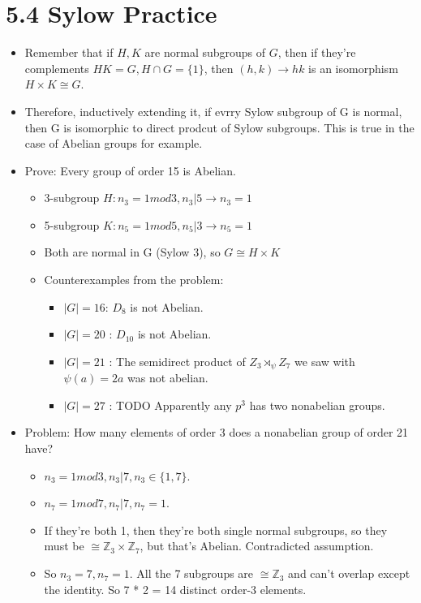 \documentclass[11pt, oneside]{article}   	%
\begin{document}
\section{5.4 Sylow Practice}
\begin{itemize}
\item Remember that if $H, K$ are normal subgroups of $G$, then if they're complements $HK = G, H \cap G = \{1\}$, then $(h, k) \rightarrow hk$ is an isomorphism $H \times K \cong G$.
\item Therefore, inductively extending it, if evrry Sylow subgroup of G is normal, then G is isomorphic to direct prodcut of Sylow subgroups.  This is true in the case of Abelian groups for example.

\item Prove: Every group of order 15 is Abelian.
\begin{itemize}
\item 3-subgroup $H: n_3 = 1 mod 3, n_3 | 5 \rightarrow n_3 = 1$
\item 5-subgroup $K: n_5 = 1 mod 5, n_5 | 3 \rightarrow n_5 = 1$
\item Both are normal in G (Sylow 3), so $G \cong H \times K$
\item Counterexamples from the problem: 
\begin{itemize}
\item $|G| = 16$: $D_{8}$ is not Abelian.
\item $|G| = 20$ : $D_{10}$ is not Abelian.
\item $|G| = 21$ : The semidirect product of $Z_3 \rtimes_{\psi} Z_7$ we saw with $\psi(a) = 2a$ was not abelian.
\item $|G| = 27$ : TODO Apparently any $p^3$ has two nonabelian groups.  
\end{itemize}
\end{itemize}

\item Problem: How many elements of order 3 does a nonabelian group of order 21 have?
\begin{itemize}
\item $n_3 = 1 mod 3, n_3 | 7, n_3 \in \{1, 7\}$.
\item $n_7 = 1 mod 7, n_7 | 7, n_7 = 1$.
\item If they're both 1, then they're both single normal subgroups, so they must be $\cong \mathbb{Z}_3 \times \mathbb{Z}_7$, but that's Abelian.  Contradicted assumption.
\item So $n_3 = 7, n_7 = 1$.  All the 7 subgroups are $\cong  \mathbb{Z}_3$ and can't overlap except the identity.  So 7 * 2 = 14 distinct order-3 elements.
\end{itemize}


\end{itemize}
\end{document}
